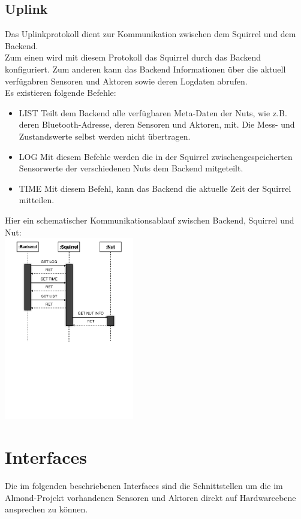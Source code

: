 \documentclass[12pt,a4paper]{article}
\begin{document}
	\subsection{Uplink}
Das Uplinkprotokoll dient zur Kommunikation zwischen dem Squirrel und dem Backend.\\
Zum einen wird mit diesem Protokoll das Squirrel durch das Backend konfiguriert. Zum anderen kann das Backend Informationen über die aktuell verfügabren Sensoren und Aktoren sowie deren Logdaten abrufen.\\
Es existieren folgende Befehle:
\begin{itemize}
	\item{LIST}
Teilt dem Backend alle verfügbaren Meta-Daten der Nuts, wie z.B. deren Bluetooth-Adresse, deren Sensoren und Aktoren, mit. Die Mess- und Zustandswerte selbst werden nicht übertragen.

	\item{LOG}
Mit diesem Befehle werden die in der Squirrel zwischengespeicherten Sensorwerte der verschiedenen Nuts dem Backend mitgeteilt.

	\item{TIME}
Mit diesem Befehl, kann das Backend die aktuelle Zeit der Squirrel mitteilen.

\end{itemize}
Hier ein schematischer Kommunikationsablauf zwischen Backend, Squirrel und Nut:\\ 
\includegraphics[height=8cm]{./ProtokollSequence.pdf}\\

\section{Interfaces}
Die im folgenden beschriebenen Interfaces sind die Schnittstellen um die im Almond-Projekt vorhandenen Sensoren und Aktoren direkt auf Hardwareebene ansprechen zu können.
\end{document}

